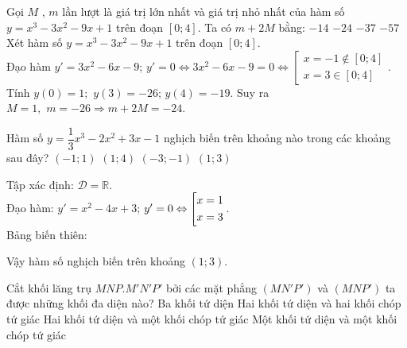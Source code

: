 \begin{ex}%
	Gọi $M$ , $m$ lần lượt là giá trị lớn nhất và giá trị nhỏ nhất của hàm số $y = x^3 - 3x^2 - 9x + 1$ trên đoạn $\left[0; 4\right]$. Ta có $m + 2M$ bằng:
	\choice
	{$-14$}
	{\True $-24$}
	{$-37$}
	{$-57$}
	\loigiai
	{Xét hàm số $y = x^3 - 3x^2 - 9x + 1$ trên đoạn $\left[0;4\right]$.\\
		Đạo hàm $y' = 3x^2 - 6x - 9$; $y' = 0 \Leftrightarrow 3x^2 - 6x - 9 = 0 \Leftrightarrow \left[ \begin{array}{l}
		x =  - 1 \notin \left[0;4\right]\\
		x = 3 \in \left[0;4\right]
		\end{array}\right.$.\\
		Tính $y(0)=1;\,\,y(3) = -26;\,y(4) = -19$. Suy ra $M = 1,\,\,m =  - 26 \Rightarrow m + 2M = -24$.
	}
\end{ex}

\begin{ex}%
	Hàm số $y = \dfrac{1}{3}x^3-2x^2+3x-1$ nghịch biến trên khoảng nào trong các khoảng sau đây?
	\choice
	{$\left(-1; 1\right)$}
	{$\left(1; 4\right)$}
	{$\left(-3; -1\right)$}
	{\True $\left(1; 3\right)$}
	\loigiai
	{Tập xác định: $\mathscr{D}=\mathbb{R}$.\\Đạo hàm: $y'=x^2-4x+3$; $y'=0\Leftrightarrow\left[\begin{aligned}&x=1\\&x=3\end{aligned}\right.$.\\Bảng biến thiên:
		\begin{center}
		\end{center}
		Vậy hàm số nghịch biến trên khoảng $\left(1; 3\right)$.
	}
\end{ex}

\begin{ex}%
	Cắt khối lăng trụ $MNP.M'N'P'$ bởi các mặt phẳng $\left(MN'P'\right)$ và $\left(MNP'\right)$ ta được những khối đa diện nào?
	\choice
	{\True Ba khối tứ diện}
	{Hai khối tứ diện và hai khối chóp tứ giác}
	{Hai khối tứ diện và một khối chóp tứ giác}
	{Một khối tứ diện và một khối chóp tứ giác}
\end{ex}

